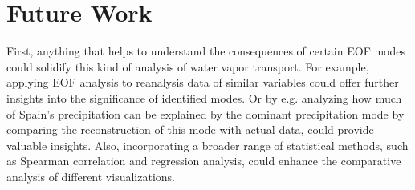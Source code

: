 \section{Future Work}
\label{sec:FutureWork}

%
%
%
First, anything that helps to understand the consequences of certain EOF modes could solidify this kind of analysis of water vapor transport. 
For example, applying EOF analysis to reanalysis data of similar variables could offer further insights into the significance of identified modes. 
Or by e.g. analyzing how much of Spain's precipitation can be explained by the dominant precipitation mode by comparing the reconstruction of this mode with actual data, could provide valuable insights.
Also, incorporating a broader range of statistical methods, such as Spearman correlation and regression analysis, could enhance the comparative analysis of different visualizations. 

